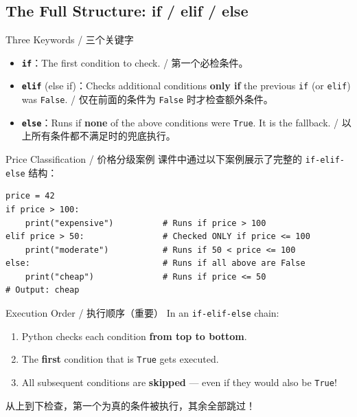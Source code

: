\documentclass[11pt,a4paper]{report}
\let\oldtexttt\texttt
\renewcommand{\texttt}[1]{\textcolor{mainblue}{\oldtexttt{#1}}}
\begin{document}
\subsection{The Full Structure: if / elif / else}

\begin{concept}{Three Keywords / 三个关键字}
    \begin{itemize}[itemsep=0.5em]
        \item \textbf{\texttt{if}}：The first condition to check. / 第一个必检条件。
        \item \textbf{\texttt{elif}} (else if)：Checks additional conditions \textbf{only if} the previous \texttt{if} (or \texttt{elif}) was \texttt{False}. / 仅在前面的条件为 \texttt{False} 时才检查额外条件。
        \item \textbf{\texttt{else}}：Runs if \textbf{none} of the above conditions were \texttt{True}. It is the fallback. / 以上所有条件都不满足时的兜底执行。
    \end{itemize}
\end{concept}

\begin{examplebox}{Price Classification / 价格分级案例}
    课件中通过以下案例展示了完整的 \texttt{if-elif-else} 结构：
\begin{lstlisting}
price = 42
if price > 100:
    print("expensive")          # Runs if price > 100
elif price > 50:                # Checked ONLY if price <= 100
    print("moderate")           # Runs if 50 < price <= 100
else:                           # Runs if all above are False
    print("cheap")              # Runs if price <= 50
# Output: cheap
\end{lstlisting}
\end{examplebox}

\begin{warning}{Execution Order / 执行顺序（重要）}
    In an \texttt{if-elif-else} chain:
    \begin{enumerate}[itemsep=0.3em]
        \item Python checks each condition \textbf{from top to bottom}.
        \item The \textbf{first} condition that is \texttt{True} gets executed.
        \item All subsequent conditions are \textbf{skipped} — even if they would also be \texttt{True}!
    \end{enumerate}
    从上到下检查，第一个为真的条件被执行，其余全部跳过！
\end{warning}
\end{document}
